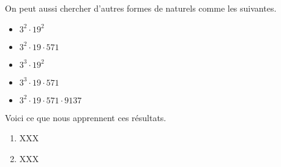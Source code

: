 On peut aussi chercher d'autres formes de naturels comme les suivantes.
\begin{multicols}{4}
    \begin{itemize}
    	\item $3^2 \cdot 19^2$
    	\item $3^2 \cdot 19 \cdot 571$

    	\item $3^3 \cdot 19^2$
    	\item $3^3 \cdot 19 \cdot 571$
    \end{itemize}
    
    \vfill\null
    \columnbreak

    \begin{itemize}
    	\item $3^2 \cdot 19 \cdot 571 \cdot 9137$
    \end{itemize}
    
    \vfill\null
    \columnbreak
\end{multicols}


Voici ce que nous apprennent ces résultats.
\begin{enumerate}
	\item XXX

	\item XXX
\end{enumerate}

